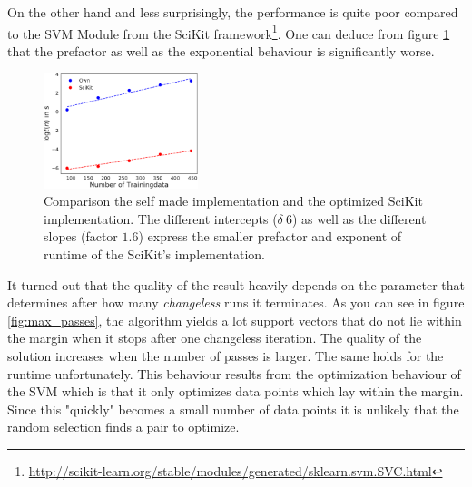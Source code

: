 On the other hand and less surprisingly, the performance is quite poor compared to the SVM Module from the SciKit framework\footnote{\url{http://scikit-learn.org/stable/modules/generated/sklearn.svm.SVC.html}}. One can deduce from figure \ref{fig:benchmark} that the prefactor as well as the exponential behaviour is significantly worse.

\begin{figure}
  \centering
    \includegraphics[width=0.4\textwidth]{media_saved/benchmark}
  \caption{Comparison the self made implementation and the optimized SciKit implementation. The different intercepts ($\delta ~ 6$) as well as the different slopes (factor $1.6$) express the smaller prefactor and exponent of runtime of the SciKit's implementation.}  
  \label{fig:benchmark}  
\end{figure}

It turned out that the quality of the result heavily depends on the parameter that determines after how many \textit{changeless} runs it terminates. As you can see in figure \ref{fig:max_passes}, the algorithm yields a lot support vectors that do not lie within the margin when it stops after one changeless iteration. The quality of the solution increases when the number of passes is larger. The same holds for the runtime unfortunately. This behaviour results from the optimization behaviour of the SVM which is that it only optimizes data points which lay within the margin. Since this "quickly" becomes a small number of data points it is unlikely that the random selection finds a pair to optimize.

